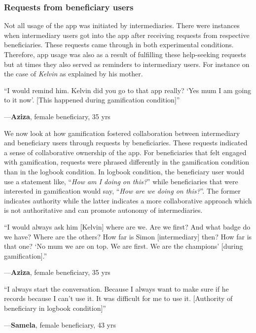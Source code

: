 \documentclass{sig-alternate}
\newenvironment{myquote}
               {\list{}{\rightmargin   \leftmargin
                        \parsep        0in }%
                \item\relax}
               {\endlist}
\newcommand{\userquote}[2]{\begin{samepage}\begin{myquote} 
     \em{\small{#2\begin{flushright}---#1\end{flushright}}}
   \end{myquote}\end{samepage}}
\begin{document}
\subsubsection*{\textbf{Requests from beneficiary users}}
Not all usage of the app was initiated by intermediaries. There were instances when intermediary users got into the app after receiving requests from respective beneficiaries. These requests came through in both experimental conditions. Therefore, app usage was also as a result of fulfilling these help-seeking requests but at times they also served as reminders to intermediary users. For instance on the case of \emph{Kelvin} as explained by his mother.

\userquote{\textbf{Aziza}, female beneficiary, 35 yrs} {``I would remind him. Kelvin did you go to that app really? `Yes mum I am going to it now'. [This happened during gamification condition]''} 

We now look at how gamification fostered collaboration between intermediary and beneficiary users through requests by beneficiaries. These requests indicated a sense of collaborative ownership of the app. For beneficiaries that felt engaged with gamification, requests were phrased differently in the gamification condition than in the logbook condition. In logbook condition, the beneficiary user would use a statement like, ``\emph{How am I doing on this?}'' while beneficiaries that were interested in gamification would say, ``\emph{How are we doing on this?}''. The former indicates authority while the latter indicates a more collaborative approach which is not authoritative and can promote autonomy of intermediaries.

\userquote{\textbf{Aziza}, female beneficiary, 35 yrs}{``I would always ask him [Kelvin] where are we. Are we first? And what badge do we have? Where are the others? How far is Simon [intermediary] then? How far is that one? `No mum we are on top. We are first. We are the champions' [during gamification].''} 

\userquote{\textbf{Samela}, female beneficiary, 43 yrs} {``I always start the conversation. Because I always want to make sure if he records because I can't use it. It was difficult for me to use it. [Authority of beneficiary in logbook condition]''}
\end{document}
